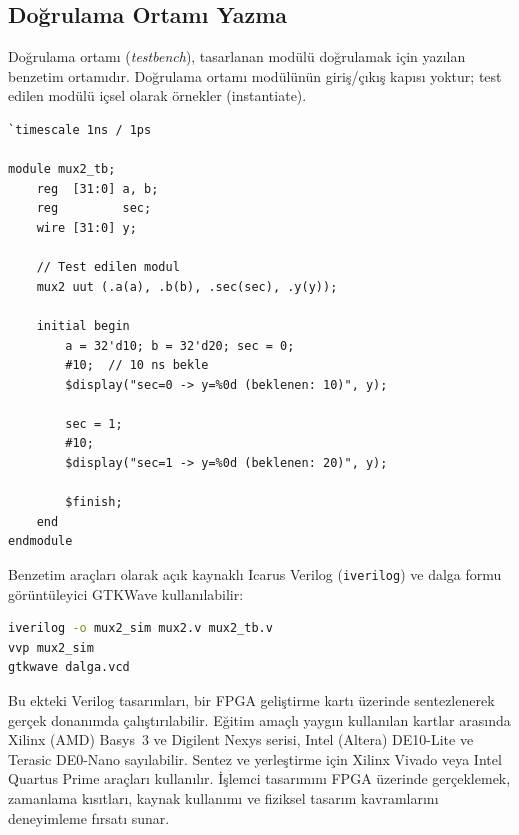 \subsection{Doğrulama Ortamı Yazma}
\label{sec:ekd-testbench}

Doğrulama ortamı (\emph{testbench}), tasarlanan modülü doğrulamak için yazılan benzetim ortamıdır. Doğrulama ortamı modülünün giriş/çıkış kapısı yoktur; test edilen modülü içsel olarak örnekler (instantiate).

\begin{lstlisting}[style=verilog, caption={2'ye 1 çoklayıcı doğrulama ortamı örneği}, label={lst:ekd-testbench}]
`timescale 1ns / 1ps

module mux2_tb;
    reg  [31:0] a, b;
    reg         sec;
    wire [31:0] y;

    // Test edilen modul
    mux2 uut (.a(a), .b(b), .sec(sec), .y(y));

    initial begin
        a = 32'd10; b = 32'd20; sec = 0;
        #10;  // 10 ns bekle
        $display("sec=0 -> y=%0d (beklenen: 10)", y);

        sec = 1;
        #10;
        $display("sec=1 -> y=%0d (beklenen: 20)", y);

        $finish;
    end
endmodule
\end{lstlisting}

Benzetim araçları olarak açık kaynaklı Icarus Verilog (\texttt{iverilog}) ve dalga formu görüntüleyici GTKWave kullanılabilir:

\begin{lstlisting}[language=bash, numbers=none, caption={Icarus Verilog ile benzetim}]
iverilog -o mux2_sim mux2.v mux2_tb.v
vvp mux2_sim
gtkwave dalga.vcd
\end{lstlisting}

\begin{bilginot}
Bu ekteki Verilog tasarımları, bir FPGA geliştirme kartı üzerinde sentezlenerek gerçek donanımda çalıştırılabilir. Eğitim amaçlı yaygın kullanılan kartlar arasında Xilinx (AMD) Basys~3 ve Digilent Nexys serisi, Intel (Altera) DE10-Lite ve Terasic DE0-Nano sayılabilir. Sentez ve yerleştirme için Xilinx Vivado veya Intel Quartus Prime araçları kullanılır. İşlemci tasarımını FPGA üzerinde gerçeklemek, zamanlama kısıtları, kaynak kullanımı ve fiziksel tasarım kavramlarını deneyimleme fırsatı sunar.
\end{bilginot}


